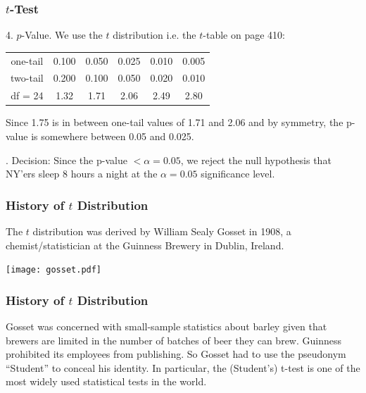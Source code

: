 \documentclass[slides]{beamer}
\newcommand{\blue}[1]{\textcolor{blue2}{#1}}
\begin{document}
\begin{frame}
\frametitle{$t$-Test}

4. $p$-Value. We use the $t$ distribution i.e. the $t$-table on page 410:
\begin{center}
\begin{tabular}{c|ccccc}
\hline
one-tail & 0.100 & 0.050 & 0.025 & 0.010 & 0.005\\
two-tail & 0.200 & 0.100 & 0.050 & 0.020 & 0.010\\
\hline
df = 24 & 1.32 & 1.71 & 2.06 & 2.49 & 2.80\\
\hline
\end{tabular}
\end{center}

Since 1.75 is in between one-tail values of 1.71 and 2.06 and by symmetry, the p-value is somewhere between 0.05 and 0.025. 

\vspace{0.5cm}

.  Decision: Since the p-value $< \alpha=0.05$, we reject the null hypothesis that NY'ers sleep 8 hours a night at the $\alpha=0.05$ significance level.  
\end{frame}



\begin{frame}
\frametitle{History of $t$ Distribution}
The $t$ distribution was derived by William Sealy Gosset in 1908, a chemist/statistician at the Guinness Brewery in Dublin, Ireland.
\begin{center}
\texttt{[image: gosset.pdf]}
\end{center}
\end{frame}


\begin{frame}
\frametitle{History of $t$ Distribution}
Gosset was concerned with \blue{small-sample statistics} about barley given that brewers are limited in the number of batches of beer they can brew.
\pause \vskip 0.5cm
Guinness prohibited its employees from publishing.  So Gosset had to use the pseudonym ``Student'' to conceal his identity.
\pause \vskip 0.5cm
In particular, the \blue{(Student's) t-test} is one of the most widely used statistical tests in the world.  
\end{frame}
\end{document}
